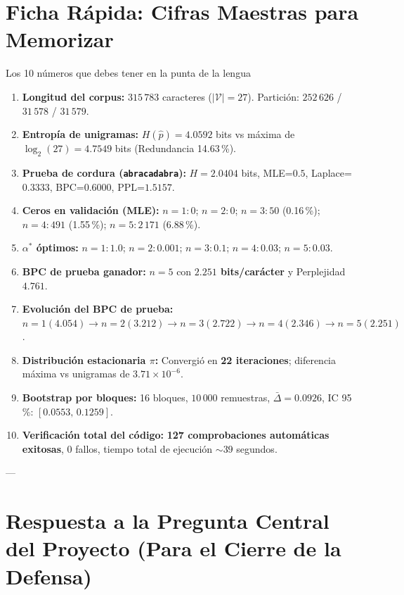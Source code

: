 \documentclass[11pt,letterpaper]{article}
\begin{document}
\section{Ficha Rápida: Cifras Maestras para Memorizar}

\begin{summarybox}{Los 10 números que debes tener en la punta de la lengua}
\begin{enumerate}[leftmargin=*, nosep]
    \item \textbf{Longitud del corpus:} $315\,783$ caracteres ($|\mathcal{V}|=27$). Partición: $252\,626$ / $31\,578$ / $31\,579$.
    \item \textbf{Entropía de unigramas:} $H(\hat{p}) = 4.0592$ bits vs máxima de $\log_2(27) = 4.7549$ bits (Redundancia 14.63\,\%).
    \item \textbf{Prueba de cordura (\texttt{abracadabra}):} $H=2.0404$ bits, MLE=$0.5$, Laplace=$0.3333$, BPC=$0.6000$, PPL=$1.5157$.
    \item \textbf{Ceros en validación (MLE):} $n=1: 0$; $n=2: 0$; $n=3: 50$ (0.16\,\%); $n=4: 491$ (1.55\,\%); $n=5: 2\,171$ (6.88\,\%).
    \item \textbf{$\alpha^*$ óptimos:} $n=1: 1.0$; $n=2: 0.001$; $n=3: 0.1$; $n=4: 0.03$; $n=5: 0.03$.
    \item \textbf{BPC de prueba ganador:} $n=5$ con \textbf{$2.251$ bits/carácter} y Perplejidad \textbf{$4.761$}.
    \item \textbf{Evolución del BPC de prueba:} $n=1 (4.054) \to n=2 (3.212) \to n=3 (2.722) \to n=4 (2.346) \to n=5 (2.251)$.
    \item \textbf{Distribución estacionaria $\pi$:} Convergió en \textbf{22 iteraciones}; diferencia máxima vs unigramas de $3.71 \times 10^{-6}$.
    \item \textbf{Bootstrap por bloques:} 16 bloques, $10\,000$ remuestras, $\bar{\Delta} = 0.0926$, IC 95\,\%: $[\mathbf{0.0553},\, \mathbf{0.1259}]$.
    \item \textbf{Verificación total del código:} \textbf{127 comprobaciones automáticas exitosas}, 0 fallos, tiempo total de ejecución $\sim 39$ segundos.
\end{enumerate}
\end{summarybox}

---

\section{Respuesta a la Pregunta Central del Proyecto (Para el Cierre de la Defensa)}
\end{document}
